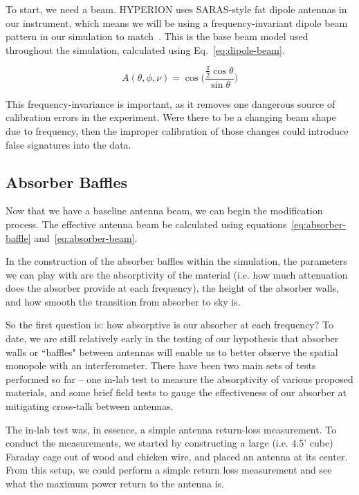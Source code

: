 To start, we need a beam. HYPERION uses SARAS-style fat dipole antennas in our 
instrument, which means we will be using a frequency-invariant dipole beam 
pattern in our simulation to match~\citep{patra2013}.  This is the base beam 
model used throughout the simulation, calculated using 
Eq.~\eqref{eq:dipole-beam}.

\begin{equation}
    \label{eq:dipole-beam}
    A(\theta, \phi, \nu) = \cos\Big(\frac{\frac{\pi}{2} 
    \cos{\theta}}{\sin{\theta}}\Big)
\end{equation}

This frequency-invariance is important, as it removes one dangerous source of 
calibration errors in the experiment. Were there to be a changing beam shape 
due to frequency, then the improper calibration of those changes could 
introduce false signatures into the data.

\subsection{Absorber Baffles}

Now that we have a baseline antenna beam, we can begin the modification 
process. The effective antenna beam be calculated using 
equations~\eqref{eq:absorber-baffle} and~\eqref{eq:absorber-beam}.

In the construction of the absorber baffles within the simulation, the 
parameters we can play with are the absorptivity of the material (i.e.  how 
much attenuation does the absorber provide at each frequency), the height of 
the absorber walls, and how smooth the transition from absorber to sky is.  

So the first question is: how absorptive is our absorber at each frequency? To 
date, we are still relatively early in the testing of our hypothesis that 
absorber walls or ``baffles" between antennas will enable us to better observe 
the spatial monopole with an interferometer.  There have been two main sets of 
tests performed so far -- one in-lab test to measure the absorptivity of 
various proposed materials, and some brief field tests to gauge the 
effectiveness of our absorber at mitigating cross-talk between antennas.

The in-lab test was, in essence, a simple antenna return-loss measurement. To 
conduct the measurements, we started by constructing a large (i.e. 4.5' cube) 
Faraday cage out of wood and chicken wire, and placed an antenna at its center.  
From this setup, we could perform a simple return loss measurement and see what 
the maximum power return to the antenna is.

